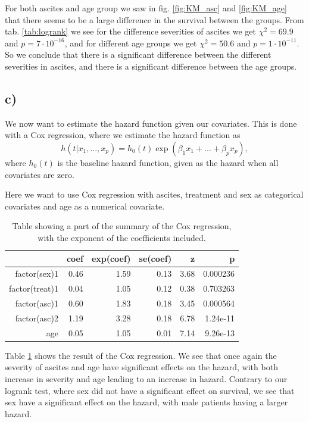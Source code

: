 \documentclass[a4paper,norsk, 10pt]{article}
\begin{document}
For both ascites and age group we saw in fig. \ref{fig:KM_asc} and \ref{fig:KM_age} that there seems to be a large difference in the survival between the groups. From tab. \ref{tab:logrank} we see for the difference severities of ascites we get $\chi^2 = 69.9$ and $p=7\cdot10^{-16}$, and for different age groups we get $\chi^2 = 50.6$ and $p=1\cdot10^{-11}$. So we conclude that there is a significant difference between the different severities in ascites, and there is a significant difference between the age groups.


\subsection{c)}
We now want to estimate the hazard function given our covariates. This is done with a Cox regression, where we estimate the hazard function as
\begin{equation}
h(t|x_1,...,x_p) = h_0(t)\exp(\beta_1 x_1 + ... + \beta_p x_p),
\end{equation}
where $h_0(t)$ is the baseline hazard function, given as the hazard when all covariates are zero.

Here we want to use Cox regression with ascites, treatment and sex as categorical covariates and age as a numerical covariate.


\begin{table}[!htb]
\centering
\begin{tabular}{rrrrrr}
  \hline
 & coef & exp(coef) & se(coef) & z & p \\ 
  \hline
factor(sex)1 & 0.46 & 1.59 & 0.13 & 3.68 & 0.000236 \\ 
  factor(treat)1 & 0.04 & 1.05 & 0.12 & 0.38 & 0.703263 \\ 
  factor(asc)1 & 0.60 & 1.83 & 0.18 & 3.45 & 0.000564 \\ 
  factor(asc)2 & 1.19 & 3.28 & 0.18 & 6.78 & 1.24e-11 \\ 
  age & 0.05 & 1.05 & 0.01 & 7.14 & 9.26e-13 \\ 
   \hline
\end{tabular}
\caption{Table showing a part of the summary of the Cox regression, with the exponent of the coefficients included.}\label{tab:cox}
\end{table}

Table \ref{tab:cox} shows the result of the Cox regression. We see that once again the severity of ascites and age have significant effects on the hazard, with both increase in severity and age leading to an increase in hazard. Contrary to our logrank test, where sex did not have a significant effect on survival, we see that sex have a significant effect on the hazard, with male patients having a larger hazard.
\end{document}
